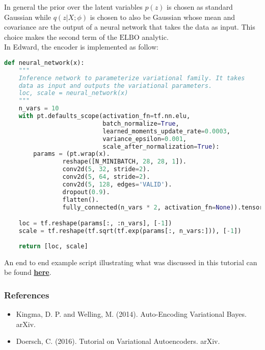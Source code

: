 \documentclass{article}
\begin{document}
\noindent In general the prior over the latent variables $p(z)$ is chosen as standard Gaussian while $q(z | X; \phi)$ is chosen to also be Gaussian whose mean and covariance are the output of a neural network that takes the data as input. This choice makes the second term of the $\mathrm{ELBO}$ analytic. \\

\noindent In Edward, the encoder is implemented as follow:

\begin{lstlisting}[language=Python]
def neural_network(x):
    """
    Inference network to parameterize variational family. It takes
    data as input and outputs the variational parameters.
    loc, scale = neural_network(x)
    """
    n_vars = 10
    with pt.defaults_scope(activation_fn=tf.nn.elu,
                           batch_normalize=True,
                           learned_moments_update_rate=0.0003,
                           variance_epsilon=0.001,
                           scale_after_normalization=True):
        params = (pt.wrap(x).
                reshape([N_MINIBATCH, 28, 28, 1]).
                conv2d(5, 32, stride=2).
                conv2d(5, 64, stride=2).
                conv2d(5, 128, edges='VALID').
                dropout(0.9).
                flatten().
                fully_connected(n_vars * 2, activation_fn=None)).tensor

    loc = tf.reshape(params[:, :n_vars], [-1])
    scale = tf.reshape(tf.sqrt(tf.exp(params[:, n_vars:])), [-1])
    
    return [loc, scale]
\end{lstlisting}

\noindent An end to end example script illustrating what was discussed in this tutorial can be found
\href{https://github.com/blei-lab/edward/blob/master/examples/convolutional_vae.py}
{\textbf{here}}.

\subsubsection*{References}\label{references}

\begin{itemize}
\item
  Kingma, D. P.  and Welling, M. (2014). Auto-Encoding Variational Bayes. arXiv.
 \item 
  Doersch, C. (2016). Tutorial on Variational Autoencoders. arXiv.
\end{itemize}
\end{document}
